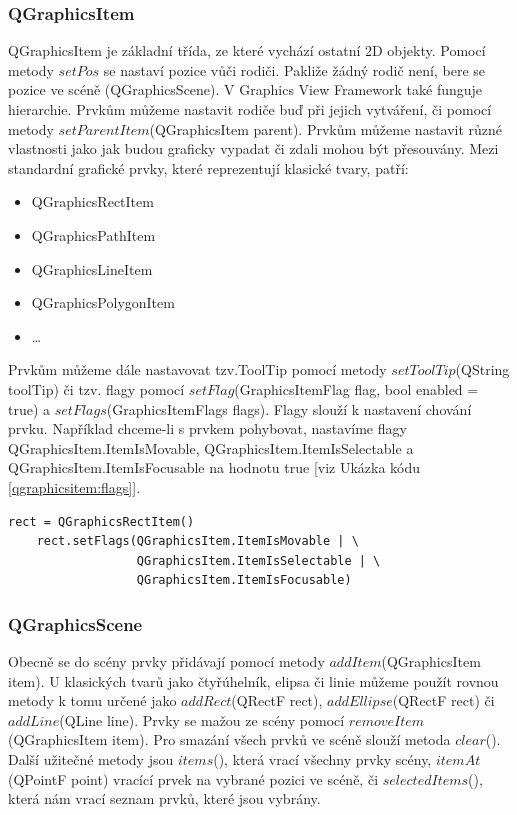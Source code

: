 \subsubsection*{QGraphicsItem}
QGraphicsItem je základní třída, ze které vychází ostatní 2D objekty. Pomocí metody $setPos$ se nastaví pozice vůči rodiči. Pakliže žádný rodič není, bere se pozice ve scéně (QGraphicsScene). V Graphics View Framework také funguje hierarchie. Prvkům můžeme nastavit rodiče buď při jejich vytváření, či pomocí metody $setParentItem$(QGraphicsItem parent). Prvkům můžeme nastavit různé vlastnosti jako jak budou graficky vypadat či zdali mohou být přesouvány. Mezi standardní grafické prvky, které reprezentují klasické tvary, patří:\\
\begin{itemize}
	\item QGraphicsRectItem
	\item QGraphicsPathItem
	\item QGraphicsLineItem
	\item QGraphicsPolygonItem
	\item \ldots
\end{itemize}
 
Prvkům můžeme dále nastavovat tzv.ToolTip pomocí metody $setToolTip$(QString toolTip) či tzv. flagy pomocí $setFlag$(GraphicsItemFlag flag, bool enabled = true) a $setFlags$(GraphicsItemFlags flags). Flagy slouží k nastavení chování prvku. Například chceme-li s prvkem pohybovat, nastavíme flagy QGraphicsItem.ItemIsMovable, QGraphicsItem.ItemIsSelectable a QGraphicsItem.ItemIsFocusable na hodnotu true [viz Ukázka kódu \ref{qgraphicsitem:flags}].\\
 
\begin{lstlisting}[label=qgraphicsitem:flags,caption={Nastavení flagů u QGraphicsRectItem}, morekeywords={QGraphicsItem, QGraphicsRectItem}] 
	rect = QGraphicsRectItem()
	rect.setFlags(QGraphicsItem.ItemIsMovable | \
				  QGraphicsItem.ItemIsSelectable | \
				  QGraphicsItem.ItemIsFocusable)
\end{lstlisting}
 
\subsubsection*{QGraphicsScene}
Obecně se do scény prvky přidávají pomocí metody $addItem$(QGraphicsItem item). U klasických tvarů jako čtyřúhelník, elipsa či linie můžeme použít rovnou metody k tomu určené jako $addRect$(QRectF rect), $addEllipse$(QRectF rect) či $addLine$(QLine line). Prvky se mažou ze scény pomocí $removeItem$(QGraphicsItem item). Pro smazání všech prvků ve scéně slouží metoda $clear$(). Další užitečné metody jsou $items$(), která vrací všechny prvky scény, $itemAt$(QPointF point) vracící prvek na vybrané pozici ve scéně, či $selectedItems$(), která nám vrací seznam prvků, které jsou vybrány.

